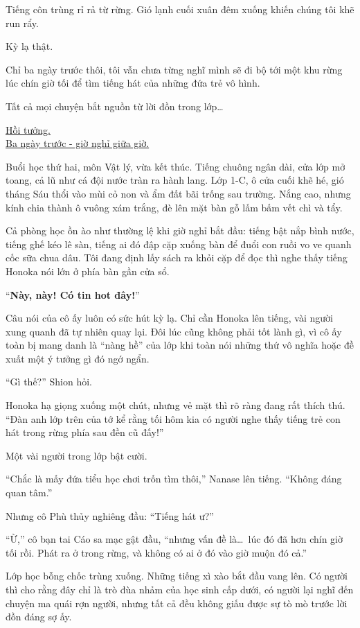 \documentclass[../main.tex]{subfiles}
\begin{document}
Tiếng côn trùng rỉ rả từ rừng. Gió lạnh cuối xuân đêm xuống khiến chúng tôi khẽ run rẩy.

Kỳ lạ thật.

Chỉ ba ngày trước thôi, tôi vẫn chưa từng nghĩ mình sẽ đi bộ tới một khu rừng lúc chín giờ tối để tìm tiếng hát của những đứa trẻ vô hình.

Tất cả mọi chuyện bắt nguồn từ lời đồn trong lớp\dots

\begin{center}
  \uline{Hồi tưởng.\\Ba ngày trước - giờ nghỉ giữa giờ.}
\end{center}

Buổi học thứ hai, môn Vật lý, vừa kết thúc. Tiếng chuông ngân dài, cửa lớp mở toang, cả lũ như cá đội nước tràn ra hành lang. Lớp 1-C, ô cửa cuối khẽ hé, gió tháng Sáu thổi vào mùi cỏ non và ẩm đất bãi trống sau trường. Nắng cao, nhưng kính chia thành ô vuông xám trắng, đè lên mặt bàn gỗ lấm bấm vết chì và tẩy.

Cả phòng học ồn ào như thường lệ khi giờ nghỉ bắt đầu: tiếng bật nắp bình nước, tiếng ghế kéo lê sàn, tiếng ai đó đập cặp xuống bàn để đuổi con ruồi vo ve quanh cốc sữa chua dâu. Tôi đang định lấy sách ra khỏi cặp để đọc thì nghe thấy tiếng Honoka nói lớn ở phía bàn gần cửa sổ.

``\textbf{Này, này! Có tin hot đây!}''

Câu nói của cô ấy luôn có sức hút kỳ lạ. Chỉ cần Honoka lên tiếng, vài người xung quanh đã tự nhiên quay lại. Đôi lúc cũng không phải tốt lành gì, vì cô ấy toàn bị mang danh là ``nàng hề'' của lớp khi toàn nói những thứ vô nghĩa hoặc đề xuất một ý tưởng gì đó ngớ ngẩn.

``Gì thế?'' Shion hỏi.

Honoka hạ giọng xuống một chút, nhưng vẻ mặt thì rõ ràng đang rất thích thú. ``Đàn anh lớp trên của tớ kể rằng tối hôm kia có người nghe thấy tiếng trẻ con hát trong rừng phía sau đền cũ đấy!''

Một vài người trong lớp bật cười.

``Chắc là mấy đứa tiểu học chơi trốn tìm thôi,'' Nanase lên tiếng. ``Không đáng quan tâm.''

Nhưng cô Phù thủy nghiêng đầu: ``Tiếng hát ư?''

``Ừ,'' cô bạn tai Cáo sa mạc gật đầu, ``nhưng vấn đề là\dots\ lúc đó đã hơn chín giờ tối rồi. Phát ra ở trong rừng, và không có ai ở đó vào giờ muộn đó cả.''

Lớp học bỗng chốc trùng xuống. Những tiếng xì xào bắt đầu vang lên. Có người thì cho rằng đây chỉ là trò đùa nhảm của học sinh cấp dưới, có người lại nghĩ đến chuyện ma quái rợn người, nhưng tất cả đều không giấu được sự tò mò trước lời đồn đáng sợ ấy.
\end{document}
